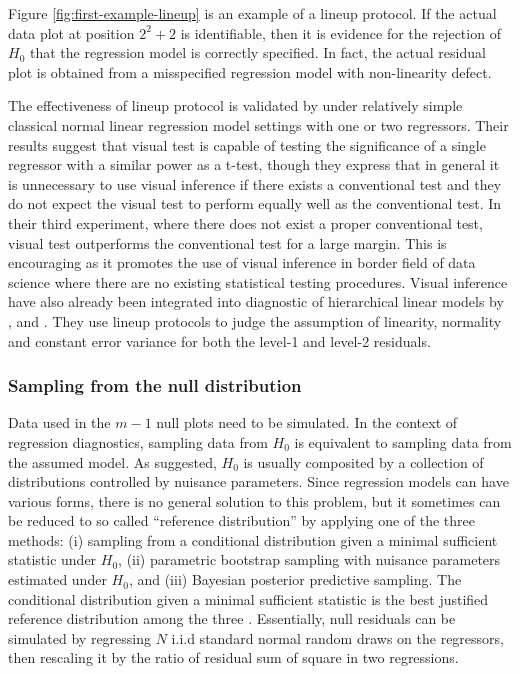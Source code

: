 \documentclass[]{interact}
\theoremstyle{plain}%
\theoremstyle{definition}
\theoremstyle{remark}
\begin{document}
Figure \ref{fig:first-example-lineup} is an example of a lineup
protocol. If the actual data plot at position \(2^2 + 2\) is
identifiable, then it is evidence for the rejection of \(H_0\) that the
regression model is correctly specified. In fact, the actual residual
plot is obtained from a misspecified regression model with non-linearity
defect.

The effectiveness of lineup protocol is validated by
\citet{majumder_validation_2013} under relatively simple classical
normal linear regression model settings with one or two regressors.
Their results suggest that visual test is capable of testing the
significance of a single regressor with a similar power as a t-test,
though they express that in general it is unnecessary to use visual
inference if there exists a conventional test and they do not expect the
visual test to perform equally well as the conventional test. In their
third experiment, where there does not exist a proper conventional test,
visual test outperforms the conventional test for a large margin. This
is encouraging as it promotes the use of visual inference in border
field of data science where there are no existing statistical testing
procedures. Visual inference have also already been integrated into
diagnostic of hierarchical linear models by \citet{loy2013diagnostic},
\citet{loy2014hlmdiag} and \citet{loy2015you}. They use lineup protocols
to judge the assumption of linearity, normality and constant error
variance for both the level-1 and level-2 residuals.

\hypertarget{sampling-from-the-null-distribution}{%
\subsubsection{Sampling from the null
distribution}\label{sampling-from-the-null-distribution}}

Data used in the \(m - 1\) null plots need to be simulated. In the
context of regression diagnostics, sampling data from \(H_0\) is
equivalent to sampling data from the assumed model. As
\citet{buja_statistical_2009} suggested, \(H_0\) is usually composited
by a collection of distributions controlled by nuisance parameters.
Since regression models can have various forms, there is no general
solution to this problem, but it sometimes can be reduced to so called
``reference distribution'' by applying one of the three methods: (i)
sampling from a conditional distribution given a minimal sufficient
statistic under \(H_0\), (ii) parametric bootstrap sampling with
nuisance parameters estimated under \(H_0\), and (iii) Bayesian
posterior predictive sampling. The conditional distribution given a
minimal sufficient statistic is the best justified reference
distribution among the three \citep{buja_statistical_2009}. Essentially,
null residuals can be simulated by regressing \(N\) i.i.d standard
normal random draws on the regressors, then rescaling it by the ratio of
residual sum of square in two regressions.
\end{document}
